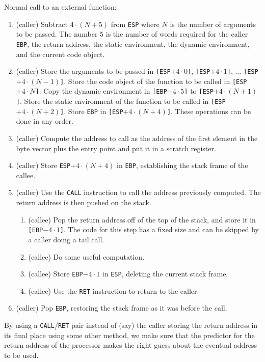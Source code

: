 Normal call to an external function:

\begin{enumerate}
\item (caller) Subtract $4 \cdot (N + 5)$ from \texttt{ESP} where $N$
  is the number of arguments to be passed.  The number $5$ is the
  number of words required for the caller \texttt{EBP}, the return
  address, the static environment, the dynamic environment, and the
  current code object.
\item (caller) Store the arguments to be passed in
  \texttt{[ESP$+ 4 \cdot 0$]}, 
  \texttt{[ESP$+ 4 \cdot 1$]}, 
  $\ldots$
  \texttt{[ESP$+ 4 \cdot (N - 1)$]}.
  Store the code object of the function to be called in 
  \texttt{[ESP$+4 \cdot N$]}.  
  Copy the dynamic environment in 
  \texttt{[EBP$-4 \cdot 5$]} to 
  \texttt{[ESP$+4 \cdot (N + 1)$]}.  
  Store the static environment of the function to be called in 
  \texttt{[ESP$+4 \cdot (N + 2)$]}.    
  Store \texttt{EBP} in  
  \texttt{[ESP$+4 \cdot (N + 4)$]}.  
  These operations can be done in any order.
\item (caller) Compute the address to call as the address of the first
  element in the byte vector plus the entry point and put it in a
  scratch register.
\item (caller) Store \texttt{ESP$+4 \cdot (N + 4)$} in \texttt{EBP},
  establishing the stack frame of the callee.
\item (caller) Use the \texttt{CALL} instruction to call the address
  previously computed.  The return address is then pushed on the
  stack. 
  \begin{enumerate}
  \item (callee) Pop the return address off of the top of the stack,
    and store it in \texttt{[EBP$- 4 \cdot 1$]}.  The code for this
    step has a fixed size and can be skipped by a caller doing a tail
    call.
  \item (callee) Do some useful computation.
  \item (callee) Store \texttt{EBP$- 4 \cdot 1$} in \texttt{ESP},
    deleting the current stack frame.
  \item (callee) Use the \texttt{RET} instruction to return to the
    caller.
  \end{enumerate}
\item (caller) Pop \texttt{EBP}, restoring the stack frame as it was
  before the call.
\end{enumerate}

By using a \texttt{CALL}/\texttt{RET} pair instead of (say) the caller
storing the return address in its final place using some other method,
we make sure that the predictor for the return address of the
processor makes the right guess about the eventual address to be
used. 

